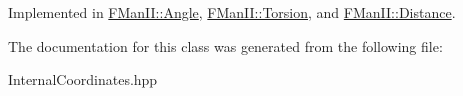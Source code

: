 Implemented in \hyperlink{classFManII_1_1Angle_a48105b9c14048db6ccea1a410e8943f1}{F\+Man\+I\+I\+::\+Angle}, \hyperlink{classFManII_1_1Torsion_a5b1871f59ce0112bd17ee0add9bf993e}{F\+Man\+I\+I\+::\+Torsion}, and \hyperlink{classFManII_1_1Distance_a16c3e07ee527b33379311e9099ec6497}{F\+Man\+I\+I\+::\+Distance}.



The documentation for this class was generated from the following file\+:\begin{DoxyCompactItemize}
\item 
Internal\+Coordinates.\+hpp\end{DoxyCompactItemize}
